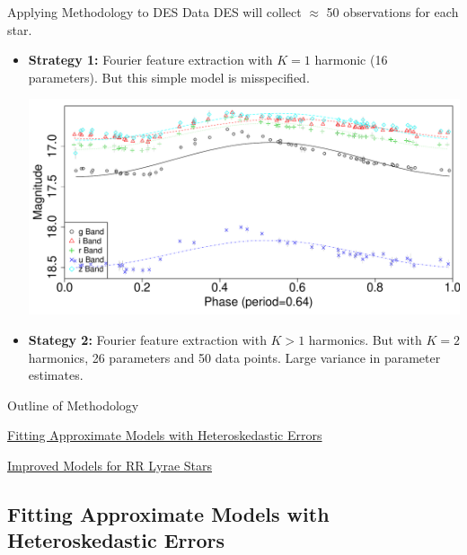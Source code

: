 \documentclass[12pt]{beamer}
\begin{document}
\begin{frame}{Applying Methodology to DES Data}
  DES will collect $\approx$ 50 observations for each star.

  \begin{itemize}
    \item \textbf{Strategy 1:} Fourier feature extraction with $K=1$ harmonic (16 parameters). But this simple model is misspecified.

  \begin{center}
    \includegraphics[scale=.25]{figs/rrlyrae_model_fit_sine.pdf}
  \end{center}

\item \textbf{Stategy 2:} Fourier feature extraction with $K>1$ harmonics. But with $K=2$ harmonics, 26 parameters and 50 data points. Large variance in parameter estimates.
  \end{itemize}
\end{frame}


\begin{frame}{Outline of Methodology}

\underline{Fitting Approximate Models with Heteroskedastic Errors}\\

\vspace{.4in}

\underline{Improved Models for RR Lyrae Stars}
  
\end{frame}




\subsection{Fitting Approximate Models with Heteroskedastic Errors}
\end{document}
